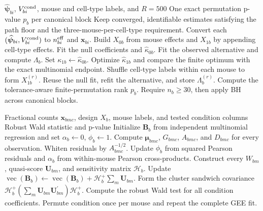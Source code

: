 \documentclass[11pt]{article}
\newcommand{\Beta}{\bm B}
\begin{document}
\begin{algorithm}[H]
\caption{Paired compositional cell-type test}
\label{alg:compositional}
\begin{algorithmic}[1]
\Require \(\widehat{\bm\psi}_{bi}\), \(V_{bi}^{\rm cond}\), mouse and cell-type labels, and \(R=500\)
\Ensure One exact permutation p-value \(p_b\) per canonical block
\State Keep converged, identifiable estimates satisfying the path floor and the three-mouse-per-cell-type requirement.
\State Convert each \((\widehat{\bm\psi}_{bi},V_{bi}^{\rm cond})\) to \(n_{bi}^{\rm eff}\) and \(\bm x_{bi}\).
\State Build \(X_{0b}\) from mouse effects and \(X_{1b}\) by appending cell-type effects.
\State Fit the null coefficients and \(\widehat\kappa_{0b}\).
\State Fit the observed alternative and compute \(\Lambda_b\).
  \State Set \(\kappa_{1b}\gets\widehat\kappa_{0b}\).
\Else
  \State Optimize \(\widehat\kappa_{1b}\) and compare the finite optimum with the exact multinomial endpoint.
\EndIf
{}
  \State Shuffle cell-type labels within each mouse to form \(X_{1b}^{(r)}\).
  \State Reuse the null fit, refit the alternative, and store \(\Lambda_b^{(r)}\).
\EndFor
\State Compute the tolerance-aware finite-permutation rank \(p_b\).
\State Require \(n_b\geq30\), then apply BH across canonical blocks.
\end{algorithmic}
\end{algorithm}

\begin{algorithm}[H]
\caption{Liang--Zeger multinomial GEE condition test}
\label{alg:gee}
\begin{algorithmic}[1]
\Require Fractional counts \(\bm x_{bmc}\), design \(X_b\), mouse labels, and tested condition columns
\Ensure Robust Wald statistic and p-value
\State Initialize \(\Beta_b\) from independent multinomial regression and set \(\alpha_b\gets0\), \(\phi_b\gets1\).
\Repeat
  \State Compute \(\bm\mu_{bmc}\), \(G_{bmc}\), \(A_{bmc}\), and \(D_{bmc}\) for every observation.
  \State Whiten residuals by \(A_{bmc}^{-1/2}\).
  \State Update \(\phi_b\) from squared Pearson residuals and \(\alpha_b\) from within-mouse Pearson cross-products.
  \State Construct every \(W_{bm}\), quasi-score \(\bm U_{bm}\), and sensitivity matrix \(\mathcal H_b\).
  \State Update \(\operatorname{vec}(\Beta_b)\gets \operatorname{vec}(\Beta_b)+\mathcal H_b^+\sum_m\bm U_{bm}\).
\State Form the cluster sandwich covariance \(\mathcal H_b^+(\sum_m\bm U_{bm}\bm U_{bm}^\prime)\mathcal H_b^+\).
\State Compute the robust Wald test for all condition coefficients.
\State Permute condition once per mouse and repeat the complete GEE fit.
\end{algorithmic}
\end{algorithm}
\end{document}
